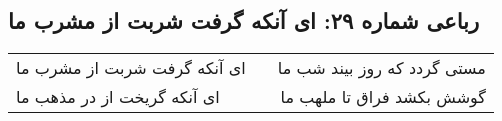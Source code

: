 \begin{center}
\section*{رباعی شماره ۲۹: ای آنکه گرفت شربت از مشرب ما}
\label{sec:0029}
\begin{longtable}{l p{0.5cm} r}
ای آنکه گرفت شربت از مشرب ما
&&
مستی گردد که روز بیند شب ما
\\
ای آنکه گریخت از در مذهب ما
&&
گوشش بکشد فراق تا ملهب ما
\\
\end{longtable}
\end{center}
